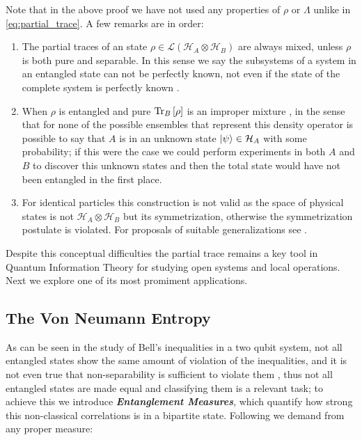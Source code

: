 Note that in the above proof we have not used any properties of $\rho$ or $\Lambda$ unlike in \eqref{eq:partial_trace}. A few remarks are
in order:
\begin{enumerate}
  \item The partial traces of an state $\rho \in \mathcal{L}(\mathcal{H}_{A}\otimes\mathcal{H}_{B})$ are always mixed, unless $\rho$ is
        both pure and separable. In this sense we say the subsystems of a system in an entangled state can not be perfectly known, not even if
        the state of the complete system is perfectly known \autocite{nielsen_quantum_2010, adesso2016introduction, diosi_short_2011}.
  \item When $\rho$ is entangled and pure $\mathrm{Tr}_{B}\left[\rho\right]$ is an improper mixture \cite{schlosshauer_decoherence_2007}, in the sense that for none of the possible ensembles that
        represent this density operator is possible to say that $A$ is in an unknown state $\ket{\psi} \in \mathcal{H}_{A}$  with some
        probability; if this were the case we could perform experiments in both $A$ and $B$ to discover this unknown states and then the total
        state would have not been entangled in the first place.
  \item For identical particles this construction is not valid as the space of physical states is not $\mathcal{H}_{A}\otimes \mathcal{H}_{B}$
        but its symmetrization, otherwise the symmetrization postulate is violated.
        For proposals of suitable generalizations see \cite{reyes-lega_aspects_2015}.
\end{enumerate}
Despite this conceptual difficulties the partial trace remains a key tool in Quantum Information Theory for studying open systems and
local operations. Next we explore one of its most promiment applications.
\subsection{The Von Neumann Entropy}
As can be seen in the study of Bell's inequalities in a two qubit system, not all entangled states show the same amount of violation of the
inequalities, and it is not even true that non-separability is sufficient to violate them \cite{ballentine_quantum_2014}, thus not all entangled
states are made equal and classifying them is a relevant task; to achieve this we introduce \textit{\textbf{Entanglement Measures}}, which
quantify how strong this non-classical correlations is in a bipartite state.
Following \cite{vedral1997quantifying} we demand from any proper measure:

